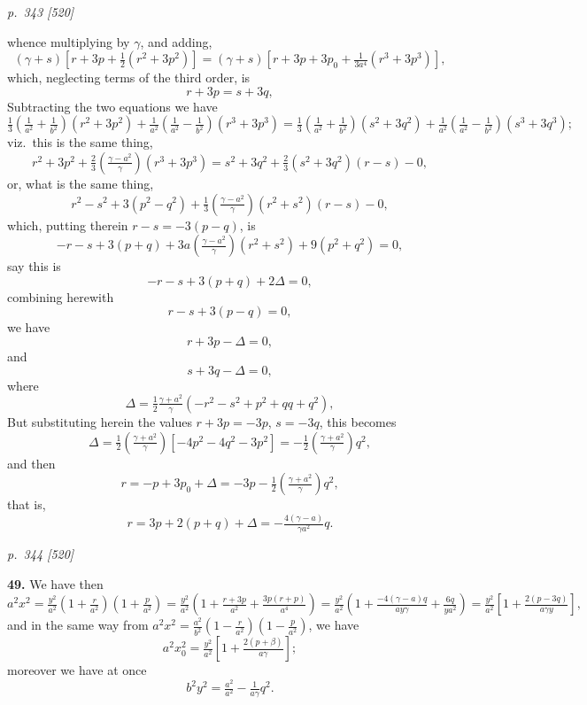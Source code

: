 \documentclass[11pt,a4paper]{article}
\theoremstyle{plain}
\theoremstyle{definition}
\begin{document}
\clearpage

\bigskip
\textit{p.~343 [520]}
\smallskip

whence multiplying by $\gamma$, and adding,
\[
(\gamma + s)\!\left[r + 3p + \tfrac{1}{2}(r^2 + 3p^2)\right] = (\gamma + s)\!\left[r + 3p + 3p_0 + \tfrac{1}{3a^4}(r^3 + 3p^3)\right],
\]
which, neglecting terms of the third order, is
\[
r + 3p = s + 3q,
\]
Subtracting the two equations we have
\[
\tfrac{1}{3}\!\left(\tfrac{1}{a^2} + \tfrac{1}{b^2}\right)(r^2 + 3p^2) + \tfrac{1}{a^2}\!\left(\tfrac{1}{a^2} - \tfrac{1}{b^2}\right)(r^3 + 3p^3) = \tfrac{1}{3}\!\left(\tfrac{1}{a^2} + \tfrac{1}{b^2}\right)(s^2 + 3q^2) + \tfrac{1}{a^2}\!\left(\tfrac{1}{a^2} - \tfrac{1}{b^2}\right)(s^3 + 3q^3);
\]
viz.\ this is the same thing,
\[
r^2 + 3p^2 + \tfrac{2}{3}\!\left(\tfrac{\gamma - a^2}{\gamma}\right)\!(r^3 + 3p^3) = s^2 + 3q^2 + \tfrac{2}{3}(s^2 + 3q^2)(r - s) - 0,
\]
or, what is the same thing,
\[
r^2 - s^2 + 3(p^2 - q^2) + \tfrac{1}{3}\!\left(\tfrac{\gamma - a^2}{\gamma}\right)\!(r^2 + s^2)(r - s) - 0,
\]
which, putting therein $r - s = -3(p - q)$, is
\[
-r - s + 3(p + q) + 3a\!\left(\tfrac{\gamma - a^2}{\gamma}\right)\!(r^2 + s^2) + 9(p^2 + q^2) = 0,
\]
say this is
\[
-r - s + 3(p + q) + 2\Delta = 0,
\]
combining herewith
\[
r - s + 3(p - q) = 0,
\]
we have
\[
r + 3p - \Delta = 0,
\]
and
\[
s + 3q - \Delta = 0,
\]
where
\[
\Delta = \tfrac{1}{2}\tfrac{\gamma + a^2}{\gamma}(-r^2 - s^2 + p^2 + qq + q^2),
\]
But substituting herein the values $r + 3p = -3p$, $s = -3q$, this becomes
\[
\Delta = \tfrac{1}{2}\!\left(\tfrac{\gamma + a^2}{\gamma}\right)\!\!\left[-4p^2 - 4q^2 - 3p^2\right] = -\tfrac{1}{2}\!\left(\tfrac{\gamma + a^2}{\gamma}\right)\!q^2,
\]
and then
\[
r = -p + 3p_0 + \Delta = -3p - \tfrac{1}{2}\!\left(\tfrac{\gamma + a^2}{\gamma}\right)\!q^2,
\]
that is,
\[
r = 3p + 2(p + q) + \Delta = -\tfrac{4(\gamma - a)}{\gamma a^2}q.
\]

\clearpage

\bigskip
\textit{p.~344 [520]}
\smallskip

\textbf{49.} We have then
\[
a^2 x^2 = \tfrac{y^2}{a^2}\!\left(1 + \tfrac{r}{a^2}\right)\!\left(1 + \tfrac{p}{a^2}\right) = \tfrac{y^2}{a^2}\!\left(1 + \tfrac{r + 3p}{a^2} + \tfrac{3p(r + p)}{a^4}\right) = \tfrac{y^2}{a^2}\!\left(1 + \tfrac{-4(\gamma - a)q}{ay\gamma} + \tfrac{6q}{y a^2}\right) = \tfrac{y^2}{a^2}\!\left[1 + \tfrac{2(p - 3q)}{a\gamma y}\right],
\]
and in the same way from $a^2 x^2 = \tfrac{a^2}{b^2}\!\left(1 - \tfrac{r}{a^2}\right)\!\left(1 - \tfrac{p}{a^2}\right)$, we have
\[
a^2 x_0^2 = \tfrac{y^2}{a^2}\!\left[1 + \tfrac{2(p + \beta)}{a\gamma}\right];
\]
moreover we have at once
\[
b^2 y^2 = \tfrac{a^2}{a^2} - \tfrac{1}{a\gamma}q^2.
\]
\end{document}
